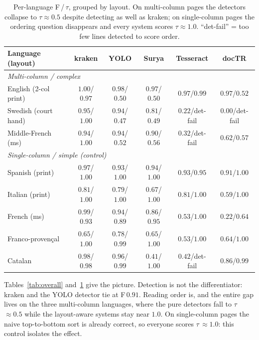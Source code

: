 \documentclass[11pt]{article}
\newcommand{\tw}{\ensuremath{\tau}}
\begin{document}
\begin{table}[t]
\centering
\caption{Per-language F\,/\,\tw{}, grouped by layout. On multi-column pages the
detectors collapse to \tw{}$\approx0.5$ despite detecting as well as kraken; on
single-column pages the ordering question disappears and every system scores
\tw{}$\approx1.0$. ``det-fail'' = too few lines detected to score order.}
\label{tab:perlang}
\small
\begin{tabular}{lccccc}
\toprule
Language (layout) & kraken & YOLO & Surya & Tesseract & docTR \\
\midrule
\multicolumn{6}{l}{\emph{Multi-column / complex}}\\
English (2-col print)        & $1.00$/$\mathbf{0.97}$ & $0.98$/$\mathbf{0.50}$ & $0.97$/$0.50$ & $0.97$/$0.99$ & $0.97$/$0.52$ \\
Swedish (court hand)         & $0.95$/$\mathbf{1.00}$ & $0.94$/$\mathbf{0.47}$ & $0.81$/$0.49$ & $0.22$/det-fail & $0.00$/det-fail \\
Middle-French (ms)           & $0.94$/$\mathbf{1.00}$ & $0.94$/$\mathbf{0.52}$ & $0.90$/$0.56$ & $0.32$/det-fail & $0.62$/$0.57$ \\
\midrule
\multicolumn{6}{l}{\emph{Single-column / simple (control)}}\\
Spanish (print)              & $0.97$/$1.00$ & $0.93$/$1.00$ & $0.94$/$1.00$ & $0.93$/$0.95$ & $0.91$/$1.00$ \\
Italian (print)              & $0.81$/$1.00$ & $0.79$/$1.00$ & $0.67$/$1.00$ & $0.81$/$1.00$ & $0.59$/$1.00$ \\
French (ms)                  & $0.99$/$0.93$ & $0.94$/$0.89$ & $0.86$/$0.95$ & $0.53$/$1.00$ & $0.22$/$0.64$ \\
Franco-proven\c{c}al         & $0.65$/$1.00$ & $0.78$/$0.99$ & $0.65$/$1.00$ & $0.53$/$1.00$ & $0.64$/$1.00$ \\
Catalan                      & $0.98$/$0.98$ & $0.96$/$0.99$ & $0.41$/$1.00$ & $0.42$/det-fail & $0.86$/$0.99$ \\
\bottomrule
\end{tabular}
\end{table}

Tables~\ref{tab:overall} and~\ref{tab:perlang} give the picture. Detection is not
the differentiator: kraken and the YOLO detector tie at F\,$0.91$. Reading order
is, and the entire gap lives on the three multi-column languages, where the pure
detectors fall to \tw{}\,$\approx0.5$ while the layout-aware systems stay near
$1.0$. On single-column pages the naive top-to-bottom sort is already correct, so
everyone scores \tw{}\,$\approx1.0$: this control isolates the effect.
\end{document}
